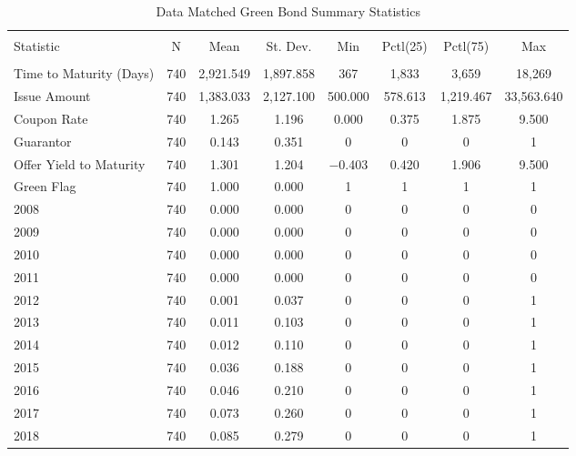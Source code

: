 \begin{table}[!htbp] \centering 
  \footnotesize
  \caption{Data Matched Green Bond Summary Statistics} 
  \label{desc2} 
\begin{tabular}{@{\extracolsep{5pt}}lccccccc} 
\\[-1.8ex]\hline 
\hline \\[-1.8ex] 
Statistic & \multicolumn{1}{c}{N} & \multicolumn{1}{c}{Mean} & \multicolumn{1}{c}{St. Dev.} & \multicolumn{1}{c}{Min} & \multicolumn{1}{c}{Pctl(25)} & \multicolumn{1}{c}{Pctl(75)} & \multicolumn{1}{c}{Max} \\ 
\hline \\[-1.8ex] 
Time to Maturity (Days) & 740 & 2,921.549 & 1,897.858 & 367 & 1,833 & 3,659 & 18,269 \\ 
Issue Amount & 740 & 1,383.033 & 2,127.100 & 500.000 & 578.613 & 1,219.467 & 33,563.640 \\ 
Coupon Rate & 740 & 1.265 & 1.196 & 0.000 & 0.375 & 1.875 & 9.500 \\ 
Guarantor & 740 & 0.143 & 0.351 & 0 & 0 & 0 & 1 \\ 
Offer Yield to Maturity & 740 & 1.301 & 1.204 & $-$0.403 & 0.420 & 1.906 & 9.500 \\
Green Flag & 740 & 1.000 & 0.000 & 1 & 1 & 1 & 1 \\ 
2008 & 740 & 0.000 & 0.000 & 0 & 0 & 0 & 0 \\ 
2009 & 740 & 0.000 & 0.000 & 0 & 0 & 0 & 0 \\ 
2010 & 740 & 0.000 & 0.000 & 0 & 0 & 0 & 0 \\ 
2011 & 740 & 0.000 & 0.000 & 0 & 0 & 0 & 0 \\ 
2012 & 740 & 0.001 & 0.037 & 0 & 0 & 0 & 1 \\ 
2013 & 740 & 0.011 & 0.103 & 0 & 0 & 0 & 1 \\ 
2014 & 740 & 0.012 & 0.110 & 0 & 0 & 0 & 1 \\ 
2015 & 740 & 0.036 & 0.188 & 0 & 0 & 0 & 1 \\ 
2016 & 740 & 0.046 & 0.210 & 0 & 0 & 0 & 1 \\ 
2017 & 740 & 0.073 & 0.260 & 0 & 0 & 0 & 1 \\ 
2018 & 740 & 0.085 & 0.279 & 0 & 0 & 0 & 1 \\ 

\end{tabular}
\end{table}
